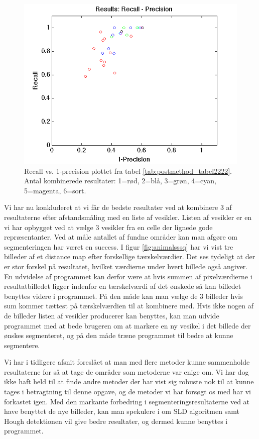 \begin{figure}[H]
	\centering
	\includegraphics[scale=0.9]{files/postmethod/img/recallvsprecision2.png}
	\caption{Recall vs. 1-precision plottet fra tabel \ref{tab:postmethod_tabel2222}. Antal kombinerede resultater: 1=rød, 2=blå, 3=grøn, 4=cyan, 5=magenta, 6=sort. \label{fig:postmethod_recallprec2}}
\end{figure}

Vi har nu konkluderet at vi får de bedste resultater ved at kombinere 3 af resultaterne efter afstandsmåling med en liste af vesikler. Listen af vesikler er en vi har opbygget ved at vælge 3 vesikler fra en celle der lignede gode repræsentanter. Ved at måle antallet af fundne områder kan man afgøre om segmenteringen har været en success. I figur \ref{fig:animalsssq} har vi vist tre billeder af et distance map efter forskellige tærskelværdier. Det ses tydeligt at der er stor forskel på resultatet, hvilket værdierne under hvert billede også angiver. En udvidelse af programmet kan derfor være at hvis summen af pixelværdierne i resultatbilledet ligger indenfor en tærskelværdi af det ønskede så kan billedet benyttes videre i programmet. På den måde kan man vælge de 3 billeder hvis sum kommer tættest på tærskelværdien til at kombinere med. Hvis ikke nogen af de billeder listen af vesikler producerer kan benyttes, kan man udvide programmet med at bede brugeren om at markere en ny vesikel i det billede der ønskes segmenteret, og på den måde træne programmet til bedre at kunne segmentere. 

Vi har i tidligere afsnit foreslået at man med flere metoder kunne sammenholde resultaterne for så at tage de områder som metoderne var enige om. Vi har dog ikke haft held til at finde andre metoder der har vist sig robuste nok til at kunne tages i betragtning til denne opgave, og de metoder vi har forsøgt os med har vi forkastet igen. Med den markante forbedring i segmenteringsresultaterne ved at have benyttet de nye billeder, kan man spekulere i om SLD algoritmen samt Hough detektionen vil give bedre resultater, og dermed kunne benyttes i programmet. 

